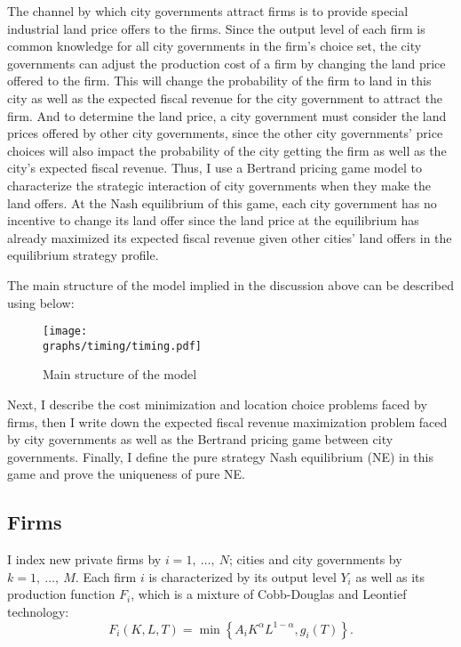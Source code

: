 The channel by which city governments attract firms is to provide
special industrial land price offers to the firms.
Since the output level of each firm is common knowledge for all city governments
in the firm's choice set, the city governments can adjust the production cost of a firm
by changing the land price offered to the firm.
This will change the probability
of the firm to land in this city as well as the expected fiscal
revenue for the city government to attract the firm.
And to determine the land price, a city government must consider the land prices
offered by other city governments, since the other city governments' price choices
will also impact the probability of the city getting the firm
as well as the city's expected fiscal revenue.
Thus, I use a Bertrand pricing game model to characterize the
strategic interaction of city governments
when they make the land offers.
At the Nash equilibrium of this game, each city government
has no incentive to change its land offer since the land price at the equilibrium
has already maximized its expected fiscal revenue given other cities' land offers in the
equilibrium strategy profile.

The main structure of the model implied in the discussion above can be described
using  below:
\begin{figure}[H]
    \centering
    \caption{Main structure of the model}
    \texttt{[image: \\graphs/timing/timing.pdf]}
    \label{fig:model structure}
\end{figure}
Next, I describe the cost minimization and location choice problems faced by firms,
then I write down the expected fiscal revenue maximization problem faced by city governments
as well as the Bertrand pricing game between city governments.
Finally, I define the pure strategy Nash equilibrium (NE) in this game
and prove the uniqueness of pure NE.

\subsection{Firms}
I index new private firms by $ i = 1,~\dots,~N$;
cities and city governments by $k = 1,~\dots,~M$.
Each firm $i$ is characterized by its output level $Y_i$
as well as its production function $F_i$, which is a mixture of Cobb-Douglas
and Leontief technology:
$$
    F_{i}(K, L, T)=\min \left\{A_{i} K^{\alpha} L^{1-\alpha}, g_{i}(T)\right\}.
$$

